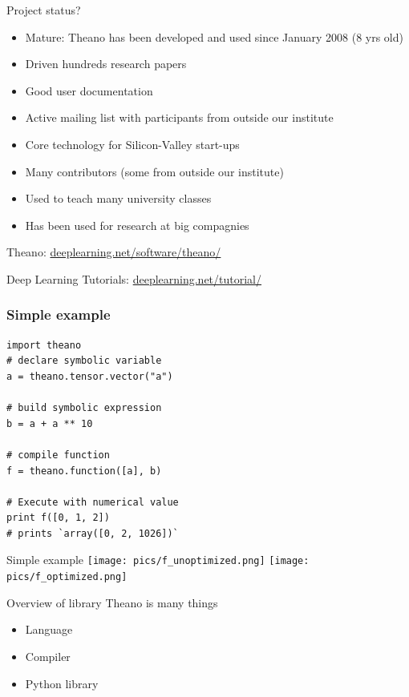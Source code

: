 \documentclass[utf8x,xcolor=pdftex,dvipsnames,table]{beamer}
\begin{document}
\begin{frame}{Project status?}
  \begin{itemize}
    \item Mature: Theano has been developed and used since January 2008 (8 yrs old)
    \item Driven hundreds research papers
    \item Good user documentation
    \item Active mailing list with participants from outside our institute
    \item Core technology for Silicon-Valley start-ups
    \item Many contributors (some from outside our institute)
    \item Used to teach many university classes
    \item Has been used for research at big compagnies
  \end{itemize}
  Theano: \url{deeplearning.net/software/theano/}

  Deep Learning Tutorials: \url{deeplearning.net/tutorial/}
\end{frame}

\begin{frame}[fragile]
  \frametitle{Simple example}

\begin{lstlisting}
import theano
# declare symbolic variable
a = theano.tensor.vector("a")

# build symbolic expression
b = a + a ** 10

# compile function
f = theano.function([a], b)

# Execute with numerical value
print f([0, 1, 2])
# prints `array([0, 2, 1026])`
\end{lstlisting}
\end{frame}

\begin{frame}{Simple example}
\center
\texttt{[image: pics/f\_unoptimized.png]}
\hspace{0.1\textwidth}
\texttt{[image: pics/f\_optimized.png]}
\end{frame}


\begin{frame}{Overview of library}
  Theano is many things
  \begin{itemize}
  \item Language
  \item Compiler
  \item Python library
  \end{itemize}
\end{frame}
\end{document}

